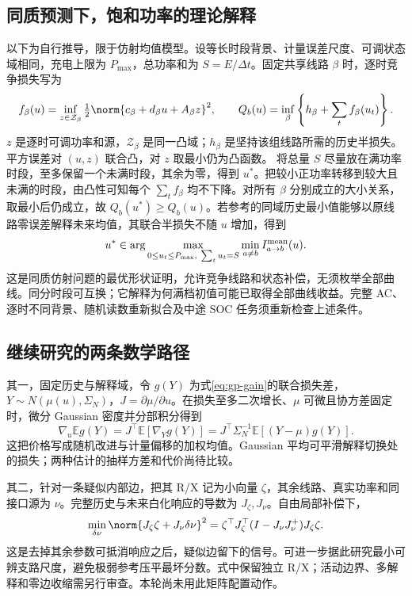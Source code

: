 \subsection{同质预测下，饱和功率的理论解释}
以下为自行推导，限于仿射均值模型。设等长时段背景、计量误差尺度、可调状态域相同，充电上限为 $P_{\max}$，总功率和为 $S=E/\Delta t$。固定共享线路 $\beta$ 时，逐时竞争损失写为
\begin{equation}
f_\beta(u)=\inf_{z\in\mathcal Z_\beta}\tfrac12\norm{c_\beta+d_\beta u+A_\beta z}^2,
\qquad Q_b(u)=\inf_\beta\left\{h_\beta+\sum_t f_\beta(u_t)\right\}.
\label{eq:gp-stationary}
\end{equation}
$z$ 是逐时可调功率和源，$\mathcal Z_\beta$ 是同一凸域；$h_\beta$ 是坚持该组线路所需的历史半损失。平方误差对 $(u,z)$ 联合凸，对 $z$ 取最小仍为凸函数。
将总量 $S$ 尽量放在满功率时段，至多保留一个未满时段，其余为零，得到 $u^*$。把较小正功率转移到较大且未满的时段，由凸性可知每个 $\sum_t f_\beta$ 均不下降。对所有 $\beta$ 分别成立的大小关系，取最小后仍成立，故 $Q_b(u^*)\ge Q_b(u)$。若参考的同域历史最小值能够以原线路零误差解释未来均值，其联合半损失不随 $u$ 增加，得到
\begin{equation}
u^*\in\arg\max_{0\le u_t\le P_{\max},\ \sum_tu_t=S}
\min_{a\ne b}I_{a\to b}^{\rm mean}(u).
\label{eq:gp-saturated}
\end{equation}
这是同质仿射问题的最优形状证明，允许竞争线路和状态补偿，无须枚举全部曲线。同分时段可互换；它解释为何满档初值可能已取得全部曲线收益。完整 AC、逐时不同背景、随机读数重新拟合及中途 SOC 任务须重新检查上述条件。

\subsection{继续研究的两条数学路径}
其一，固定历史与解释域，令 $g(Y)$ 为式\eqref{eq:gp-gain}的联合损失差，$Y\sim N(\mu(u),\Sigma_N)$，$J=\partial\mu/\partial u$。在损失至多二次增长、$\mu$ 可微且协方差固定时，微分 Gaussian 密度并分部积分得到
\begin{equation}
\nabla_u\mathbb E g(Y)=J^\top\mathbb E[\nabla_Yg(Y)]
=J^\top\Sigma_N^{-1}\mathbb E[(Y-\mu)g(Y)].
\label{eq:gp-score}
\end{equation}
这把价格写成随机改进与计量偏移的加权均值。Gaussian 平均可平滑解释切换处的损失；两种估计的抽样方差和代价尚待比较。

其二，针对一条疑似内部边，把其 R/X 记为小向量 $\zeta$，其余线路、真实功率和同接口源为 $\nu$。完整历史与未来白化响应的导数为 $J_\zeta,J_\nu$。自由局部补偿下，
\begin{equation}
\min_{\delta\nu}\norm{J_\zeta\zeta+J_\nu\delta\nu}^2
=\zeta^\top J_\zeta^\top(I-J_\nu J_\nu^+)J_\zeta\zeta.
\label{eq:gp-weak-information}
\end{equation}
这是去掉其余参数可抵消响应之后，疑似边留下的信号。可进一步据此研究最小可辨支路尺度，避免极弱参考压平最坏分数。式中保留独立 R/X；活动边界、多解释和零边收缩需另行审查。本轮尚未用此矩阵配置动作。

